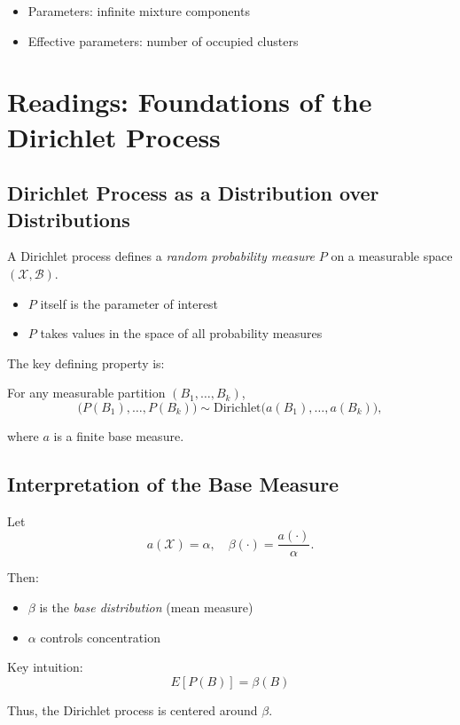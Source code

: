 \documentclass[12pt,oneside]{book}
\numberwithin{equation}{section}
\theoremstyle{definition}
\theoremstyle{plain}
\theoremstyle{remark}
\begin{document}
\begin{itemize}
\item Parameters: infinite mixture components
\item Effective parameters: number of occupied clusters
\end{itemize}

\section{Readings: Foundations of the Dirichlet Process}

\subsection*{Dirichlet Process as a Distribution over Distributions}

A Dirichlet process defines a \emph{random probability measure} $P$ on a measurable space $(\mathcal{X}, \mathcal{B})$.

\begin{itemize}
\item $P$ itself is the parameter of interest
\item $P$ takes values in the space of all probability measures
\end{itemize}

The key defining property is:

For any measurable partition $(B_1, \dots, B_k)$,
\[
\big(P(B_1), \dots, P(B_k)\big)
\sim \mathrm{Dirichlet}\big(a(B_1), \dots, a(B_k)\big),
\]

where $a$ is a finite base measure.

\subsection*{Interpretation of the Base Measure}

Let
\[
a(\mathcal{X}) = \alpha, \quad \beta(\cdot) = \frac{a(\cdot)}{\alpha}.
\]

Then:

\begin{itemize}
\item $\beta$ is the \emph{base distribution} (mean measure)
\item $\alpha$ controls concentration
\end{itemize}

Key intuition:
\[
E[P(B)] = \beta(B)
\]

Thus, the Dirichlet process is centered around $\beta$.
\end{document}
